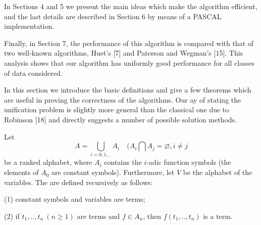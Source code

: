 In Sections 4 and 5 we present the main ideas which make the algorithm
efficient, and the last details are described in Section 6 by means of a PASCAL
implementation.

Finally, in Section 7, the performance of this algorithm is compared with that
of two well-known algorithms, Huet's [7] and Paterson and Wegman's [15]. This
analysis shows that our algorithm has uniformly good performance for all classes
of data considered.


In this section we introduce the basic definitions and give a few theorems which
are useful in proving the correctness of the algorithms. Our ay of stating the
unification problem is slightly more general than the classical one due to
Robinson [18] and directly suggests a number of possible solution methods.

Let \[A= \bigcup_{i=0,1,..} A_i \quad (A_i \bigcap A_j = \varnothing, i \neq j\]
be a ranked alphabet, where $A_i$ contains the $i$-adic function symbols (the
elements of $A_0$ are constant symbols). Furthermore, let $V$ be the alphabet of
the variables.
The  are defined recursively as follows:

(1) constant symbols and variables are terms;

(2) if $t_1,..,t_n \ (n \geq 1)$ are terms and $f \in A_n$,
then $f(t_1,..,t_n)$ is a term.
  
\secup
